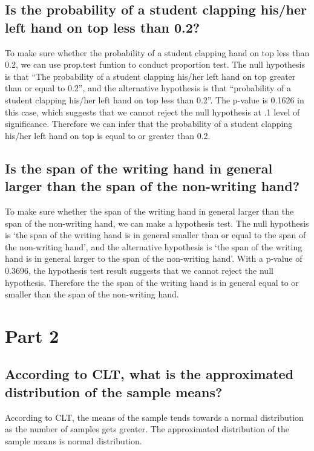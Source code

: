 \documentclass[12pt]{article}
\begin{document}
\subsection{Is the probability of a student clapping his/her left hand on top less than 0.2?}
To make sure whether the probability of a student clapping hand on top less than 0.2, we can use prop.test funtion to conduct proportion test. The null hypothesis is that “The probability of a student clapping his/her left hand on top greater than or equal to 0.2”, and the alternative hypothesis is that “probability of a student clapping his/her left hand on top less than 0.2”. The p-value is 0.1626 in this case, which suggests that we cannot reject the null hypothesis at .1 level of significance. Therefore we can infer that the probability of a student clapping his/her left hand on top is equal to or greater than 0.2.

\subsection{Is the span of the writing hand in general larger than the span of the non-writing hand?}
To make sure whether the span of the writing hand in general larger than the span of the non-writing hand, we can make a hypothesis test. The null hypothesis is ‘the span of the writing hand is in general smaller than or equal to the span of the non-writing hand’, and the alternative hypothesis is ‘the span of the writing hand is in general larger to the span of the non-writing hand’. With a p-value of 0.3696, the hypothesis test result suggests that we cannot reject the null hypothesis. Therefore the the span of the writing hand is in general equal to or smaller than the span of the non-writing hand.

\section{Part 2}
\subsection{According to CLT, what is the approximated distribution of the sample means?}
According to CLT, the means of the sample tends towards a normal distribution as the number of samples gets greater. The approximated distribution of the sample means is normal distribution.
\end{document}
